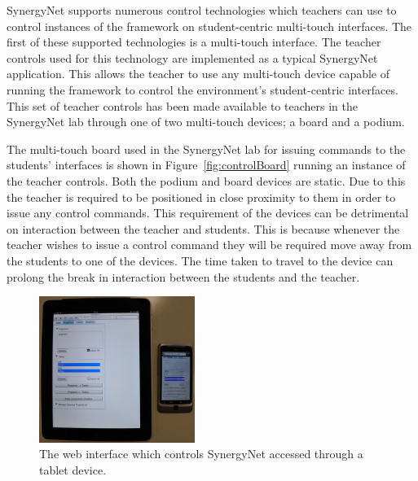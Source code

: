 \documentclass[manuscript, review, screen]{acmart}
\begin{document}
SynergyNet supports numerous control technologies which teachers can use to control instances of the framework on student-centric multi-touch interfaces.
The first of these supported technologies is a multi-touch interface.
The teacher controls used for this technology are implemented as a typical SynergyNet application.
This allows the teacher to use any multi-touch device capable of running the framework to control the environment's student-centric interfaces.
This set of teacher controls has been made available to teachers in the SynergyNet lab through one of two multi-touch devices; a board and a podium.

The multi-touch board used in the SynergyNet lab for issuing commands to the students' interfaces is shown in Figure~\ref{fig:controlBoard} running an instance of the teacher controls.
Both the podium and board devices are static.
Due to this the teacher is required to be positioned in close proximity to them in order to issue any control commands.
This requirement of the devices can be detrimental on interaction between the teacher and students.
This is because whenever the teacher wishes to issue a control command they will be required move away from the students to one of the devices.
The time taken to travel to the device can prolong the break in interaction between the students and the teacher.

\begin{figure}[h]
   \centering
   \includegraphics[width=0.45\textwidth]{figures/new_control_tablet.png}
   \caption{The web interface which controls SynergyNet accessed through a tablet device.}
   \label{fig:controlTablet}
\end{figure}
\end{document}
